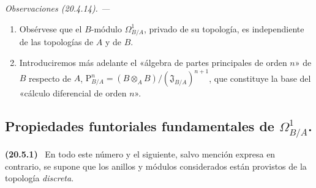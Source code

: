 \documentclass[10pt,oneside]{book}
\makeatletter
\newcommand{\setmanualcurrentlabel}[1]{\def\@currentlabel{#1}}
\newcommand{\oldpage}[2][]{%
  \setcounter{footnote}{0}%
  \marginpar{\scriptsize\textbf{#1}~|~#2}\ignorespaces}
\newenvironment{env}[1][]{\setmanualcurrentlabel{#1}\par\medskip\noindent\textbf{(#1)}\ }{\par}
\newenvironment{remarks}[1][]{%
  \setmanualcurrentlabel{#1}\par\medskip\noindent\itshape Observaciones (#1). ---\ }{\par}
\makeatother
\begin{document}
\begin{remarks}[20.4.14]
\label{0.20.4.14-es}
\begin{enumerate}
  \item[\rm(i)] Obsérvese que el $B$-módulo $\Omega^1_{B/A}$, privado de su
  topología, es independiente de las topologías de $A$ y de $B$.
  \item[\rm(ii)] Introduciremos más adelante el «álgebra de partes
  principales de orden $n$» de $B$ respecto de $A$,
  $\mathrm{P}^n_{B/A}=(B\otimes_A B)/(\mathfrak{J}_{B/A})^{n+1}$, que constituye
  la base del «cálculo diferencial de orden $n$».
\end{enumerate}
\end{remarks}

\subsection{Propiedades funtoriales fundamentales de
\texorpdfstring{$\Omega^1_{B/A}$}{Omega1(B/A)}.}
\label{subsection:0.20.5-es}

\oldpage[0\textsubscript{IV-1}]{128}
\begin{env}[20.5.1]
\label{0.20.5.1-es}
En todo este número y el siguiente, salvo mención expresa en contrario, se
supone que los anillos y módulos considerados están provistos de la topología
\emph{discreta}.
\end{env}
\end{document}
